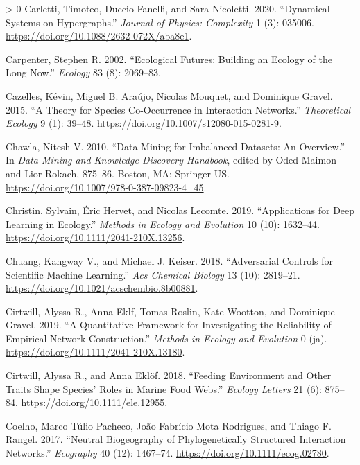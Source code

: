 \documentclass[11pt]{article}
\newlength{\cslhangindent}
\newenvironment{CSLReferences}[3] %
 {%
  \setlength{\parindent}{0pt}
  \ifodd #1 \everypar{\setlength{\hangindent}{\cslhangindent}}\ignorespaces\fi
  \ifnum #2 > 0
  \setlength{\parskip}{#2\baselineskip}
  \fi
 }%
 {}
\begin{document}
\begin{CSLReferences}{1}{0}
\leavevmode\hypertarget{ref-Carletti2020DynSys}{}%
Carletti, Timoteo, Duccio Fanelli, and Sara Nicoletti. 2020.
{``Dynamical Systems on Hypergraphs.''} \emph{Journal of Physics:
Complexity} 1 (3): 035006.
\url{https://doi.org/10.1088/2632-072X/aba8e1}.

\leavevmode\hypertarget{ref-Carpenter2002EcoFut}{}%
Carpenter, Stephen R. 2002. {``Ecological Futures: Building an Ecology
of the Long Now.''} \emph{Ecology} 83 (8): 2069--83.

\leavevmode\hypertarget{ref-Cazelles2015TheSpe}{}%
Cazelles, Kévin, Miguel B. Araújo, Nicolas Mouquet, and Dominique
Gravel. 2015. {``A Theory for Species Co-Occurrence in Interaction
Networks.''} \emph{Theoretical Ecology} 9 (1): 39--48.
\url{https://doi.org/10.1007/s12080-015-0281-9}.

\leavevmode\hypertarget{ref-Chawla2010DatMin}{}%
Chawla, Nitesh V. 2010. {``Data Mining for Imbalanced Datasets: An
Overview.''} In \emph{Data Mining and Knowledge Discovery Handbook},
edited by Oded Maimon and Lior Rokach, 875--86. Boston, MA: Springer US.
\url{https://doi.org/10.1007/978-0-387-09823-4_45}.

\leavevmode\hypertarget{ref-Christin2019AppDee}{}%
Christin, Sylvain, Éric Hervet, and Nicolas Lecomte. 2019.
{``Applications for Deep Learning in Ecology.''} \emph{Methods in
Ecology and Evolution} 10 (10): 1632--44.
\url{https://doi.org/10.1111/2041-210X.13256}.

\leavevmode\hypertarget{ref-Chuang2018AdvCon}{}%
Chuang, Kangway V., and Michael J. Keiser. 2018. {``Adversarial Controls
for Scientific Machine Learning.''} \emph{Acs Chemical Biology} 13 (10):
2819--21. \url{https://doi.org/10.1021/acschembio.8b00881}.

\leavevmode\hypertarget{ref-Cirtwill2019QuaFra}{}%
Cirtwill, Alyssa R., Anna Eklf, Tomas Roslin, Kate Wootton, and
Dominique Gravel. 2019. {``A Quantitative Framework for Investigating
the Reliability of Empirical Network Construction.''} \emph{Methods in
Ecology and Evolution} 0 (ja).
\url{https://doi.org/10.1111/2041-210X.13180}.

\leavevmode\hypertarget{ref-Cirtwill2018FeeEnv}{}%
Cirtwill, Alyssa R., and Anna Eklöf. 2018. {``Feeding Environment and
Other Traits Shape Species' Roles in Marine Food Webs.''} \emph{Ecology
Letters} 21 (6): 875--84. \url{https://doi.org/10.1111/ele.12955}.

\leavevmode\hypertarget{ref-Coelho2017NeuBio}{}%
Coelho, Marco Túlio Pacheco, João Fabrício Mota Rodrigues, and Thiago F.
Rangel. 2017. {``Neutral Biogeography of Phylogenetically Structured
Interaction Networks.''} \emph{Ecography} 40 (12): 1467--74.
\url{https://doi.org/10.1111/ecog.02780}.


\end{CSLReferences}
\end{document}
